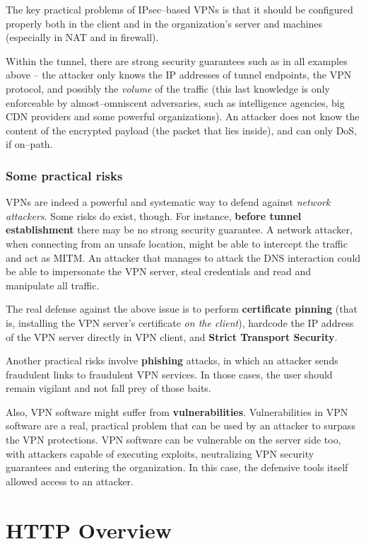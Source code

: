 \documentclass[10pt]{extbook}
\begin{document}
The key practical problems of IPsec--based VPNs is that it should be configured
properly both in the client and in the organization's server and machines
(especially in NAT and in firewall).

Within the tunnel, there are strong security guarantees such as in all examples
above -- the attacker only knows the IP addresses of tunnel endpoints, the VPN
protocol, and possibly the \emph{volume} of the traffic (this last knowledge is
only enforceable by almost--omniscent adversaries, such as intelligence
agencies, big CDN providers and some powerful organizations). An attacker does
not know the content of the encrypted payload (the packet that lies inside),
and can only DoS, if on--path.

\subsection{Some practical risks}

VPNs are indeed a powerful and systematic way to defend against \emph{network
attackers}. Some risks do exist, though. For instance, \textbf{before tunnel
establishment} there may be no strong security guarantee. A network attacker,
when connecting from an unsafe location, might be able to intercept the traffic
and act as MITM. An attacker that manages to attack the DNS interaction could
be able to impersonate the VPN server, steal credentials and read and
manipulate all traffic.

The real defense against the above issue is to perform \textbf{certificate
pinning} (that is, installing the VPN server's certificate \emph{on the
client}), hardcode the IP address of the VPN server directly in VPN client, and
\textbf{Strict Transport Security}.

Another practical risks involve \textbf{phishing} attacks, in which an attacker
sends fraudulent links to fraudulent VPN services. In those cases, the user
should remain vigilant and not fall prey of those baits.

Also, VPN software might suffer from \textbf{vulnerabilities}. Vulnerabilities
in VPN software are a real, practical problem that can be used by an attacker
to surpass the VPN protections. VPN software can be vulnerable on the server
side too, with attackers capable of executing exploits, neutralizing VPN
security guarantees and entering the organization. In this case, the defensive
tools itself allowed access to an attacker.

\chapter{HTTP Overview}
\end{document}
